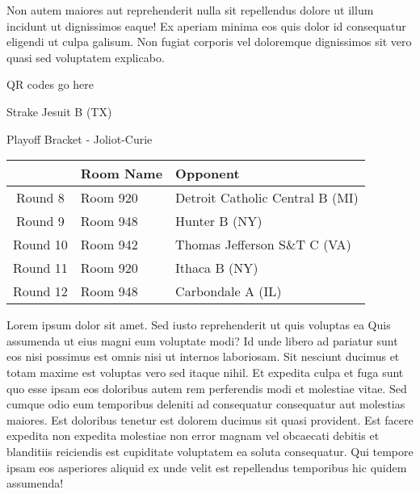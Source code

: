 \documentclass{article}%
\begin{document}
\newline%
Non autem maiores aut reprehenderit nulla sit repellendus dolore ut illum incidunt ut dignissimos eaque! Ex aperiam minima eos quis dolor id consequatur eligendi ut culpa galisum. Non fugiat corporis vel doloremque dignissimos sit vero quasi sed voluptatem explicabo.\newline%
\newline%
%
\vspace*{30pt}%
\begin{center}%
\begin{Huge}%
QR codes go here%
\end{Huge}%
\end{center}%
\newpage%
\begin{center}%
\begin{Huge}%
Strake Jesuit B (TX)%
\end{Huge}%
\vspace*{8pt}%
\linebreak%
\begin{Large}%
Playoff Bracket {-} Joliot{-}Curie%
\end{Large}%
\end{center}%
\begin{tabularx}{\textwidth}{|c|Y|Y|}%
\hline%
&Room Name&Opponent\\%
\hline%
Round 8&Room 920&Detroit Catholic Central B (MI)\\%
Round 9&Room 948&Hunter B (NY)\\%
Round 10&Room 942&Thomas Jefferson S\&T C (VA)\\%
Round 11&Room 920&Ithaca B (NY)\\%
Round 12&Room 948&Carbondale A (IL)\\%
\hline%
\end{tabularx}%
\vspace*{8pt}%
\linebreak%
\newline%
\newline%
Lorem ipsum dolor sit amet. Sed iusto reprehenderit ut quis voluptas ea Quis assumenda ut eius magni eum voluptate modi? Id unde libero ad pariatur sunt eos nisi possimus est omnis nisi ut internos laboriosam. Sit nesciunt ducimus et totam maxime est voluptas vero sed itaque nihil. Et expedita culpa et fuga sunt quo esse ipsam eos doloribus autem rem perferendis modi et molestiae vitae.\newline%
\newline%
Sed cumque odio eum temporibus deleniti ad consequatur consequatur aut molestias maiores. Est doloribus tenetur est dolorem ducimus sit quasi provident. Est facere expedita non expedita molestiae non error magnam vel obcaecati debitis et blanditiis reiciendis est cupiditate voluptatem ea soluta consequatur. Qui tempore ipsam eos asperiores aliquid ex unde velit est repellendus temporibus hic quidem assumenda!\newline%
\end{document}
